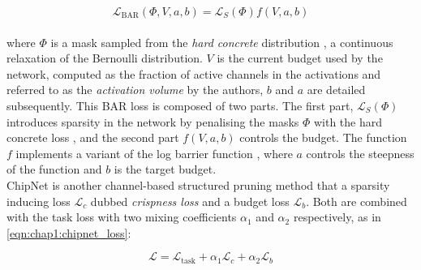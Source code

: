 \begin{equation}
  \mathcal{L}_{\text{BAR}}(\Phi,V,a,b) = \mathcal{L}_S(\Phi)f(V,a,b)
\end{equation}\\

\noindent where $\Phi$ is a mask sampled from the \emph{hard concrete}
distribution \cite{louizos2017learning}, a continuous relaxation of the
Bernoulli distribution. $V$ is the current budget used by the network, computed
as the fraction of active channels in the activations and referred to as the
\emph{activation volume} by the authors, $b$ and $a$ are \DIFdelbegin {}\DIFdelend \DIFaddbegin {}\DIFaddend detailed
subsequently. This BAR loss is composed of two parts. The first part,
$\mathcal{L}_S(\Phi)$ introduces sparsity in the network by penalising the masks
$\Phi$ with the hard concrete loss \cite{louizos2017learning}, and the second
part $f(V,a,b)$ controls the budget. The function $f$ implements a variant of
the log barrier function \cite{boyd2004convex}, where $a$ controls the steepness
of the function and $b$ is the target budget.\\

ChipNet \cite{tiwari2021chipnet} is another channel-based structured pruning
method that \DIFdelbegin {}\DIFdelend \DIFaddbegin {}\DIFaddend a sparsity inducing loss $\mathcal{L}_c$ dubbed
\emph{crispness loss} and a budget loss $\mathcal{L}_b$. Both \DIFdelbegin {}\DIFdelend \DIFaddbegin {}\DIFaddend are
combined with the task loss with two mixing coefficients $\alpha_1$ and
$\alpha_2$ respectively, as \DIFdelbegin {}\DIFdelend \DIFaddbegin {}\DIFaddend in \cref{eqn:chap1:chipnet_loss}:\DIFaddbegin \\
\DIFaddend 

\begin{equation}
  \label{eqn:chap1:chipnet_loss}
  \mathcal{L} = \mathcal{L}_{\text{task}} + \alpha_1 \mathcal{L}_c + \alpha_2 \mathcal{L}_b
\end{equation}\\

\DIFdelbegin {}%
\DIFdel{:
}\DIFdelend %

